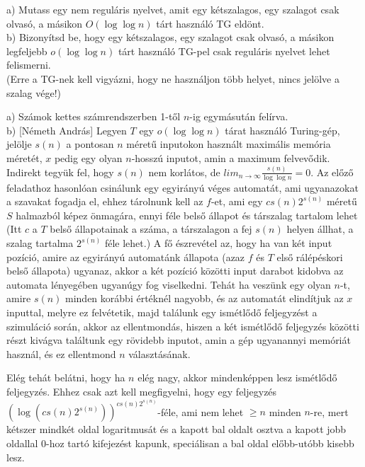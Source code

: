 \begin{Exercise}[counter={sorszam}, difficulty=1]
	a) Mutass egy nem regul\'aris nyelvet, amit egy kétszalagos, egy szalagot csak olvasó, a másikon $O(\log \log n)$ tárt használó TG eld\"ont.\\
	b) Bizonyítsd be, hogy egy kétszalagos, egy szalagot csak olvasó, a másikon legfeljebb $o(\log \log n)$ tárt használó TG-pel csak regul\'aris nyelvet lehet felismerni.\\
	(Erre a TG-nek kell vigy\'azni, hogy ne haszn\'aljon t\"obb helyet, nincs jel\"olve a szalag v\'ege!)
\end{Exercise}	
\begin{Answer}
	a) Sz\'amok kettes sz\'amrendszerben 1-t\H ol $n$-ig egym\'asut\'an fel\'irva.\\
	b) [Németh András]	
	Legyen $T$ egy $o(\log\log n)$ tárat használó Turing-gép, jelölje $s(n)$
	a pontosan $n$ méretű inputokon használt maximális memória méretét, $x$ pedig
	egy olyan $n$-hosszú inputot, amin a maximum felvevődik. Indirekt tegyük
	fel, hogy $s(n)$ nem korlátos, de $lim_{n\rightarrow \infty}\frac{s(n)}{\log
	\log n}=0$. Az előző feladathoz hasonlóan csinálunk egy egyirányú véges automatát, ami ugyanazokat a szavakat fogadja el, ehhez tárolnunk kell az $f$-et, ami egy $cs(n)2^{s(n)}$ méretű $S$ halmazból képez önmagára, ennyi féle belső állapot és társzalag tartalom lehet (Itt $c$ a $T$ belső állapotainak a száma, a társzalagon a fej $s(n)$ helyen állhat, a szalag tartalma $2^{s(n)}$ féle lehet.)
	A fő észrevétel az, hogy ha van két input
	pozíció, amire az egyirányú automatánk állapota (azaz $f$ és $T$ első rálépéskori belső állapota) ugyanaz, akkor a két
	pozíció közötti input darabot kidobva az automata lényegében ugyanúgy fog
	viselkedni. Tehát ha veszünk egy olyan $n$-t, amire $s(n)$
	minden korábbi értéknél nagyobb, és az automatát elindítjuk az $x$
	inputtal, melyre ez felvétetik, majd találunk egy ismétlődő feljegyzést a szimuláció során, akkor
	az ellentmondás, hiszen a két ismétlődő feljegyzés közötti részt kivágva
	találtunk egy rövidebb inputot, amin a gép ugyanannyi memóriát használ, és
	ez ellentmond $n$ választásának.
	
	Elég tehát belátni, hogy ha $n$ elég nagy, akkor mindenképpen lesz ismétlődő
	feljegyzés. Ehhez csak azt kell megfigyelni, hogy egy feljegyzés $(\log (cs(n)2^{s(n)}))^{cs(n)2^{s(n)}}$-féle, ami 
	nem lehet $\geq n$ minden $n$-re, mert kétszer mindkét oldal
	logaritmusát és a kapott bal oldalt
	osztva a kapott jobb oldallal $0$-hoz tartó kifejezést kapunk, speciálisan a bal oldal előbb-utóbb
	kisebb lesz.
\end{Answer}


